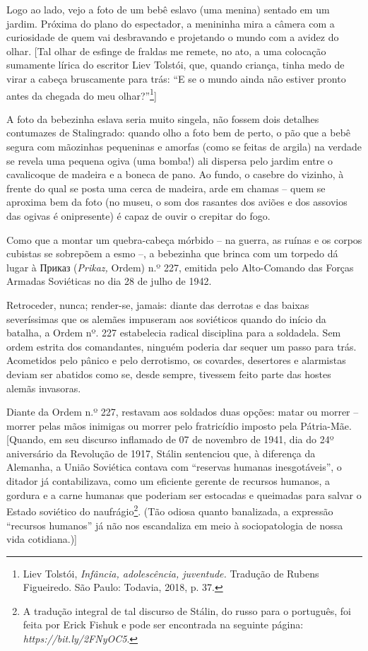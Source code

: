Logo ao lado, vejo a foto de um bebê eslavo (uma menina) sentado em um
jardim. Próxima do plano do espectador, a menininha mira a câmera com a
curiosidade de quem vai desbravando e projetando o mundo com a avidez do
olhar. {[}Tal olhar de esfinge de fraldas me remete, no ato, a uma
colocação sumamente lírica do escritor Liev Tolstói, que, quando
criança, tinha medo de virar a cabeça bruscamente para trás: ``E se o
mundo ainda não estiver pronto antes da chegada do meu
olhar?''\footnote{Liev Tolstói, \emph{Infância, adolescência,
  juventude.} Tradução de Rubens Figueiredo. São Paulo: Todavia, 2018,
  p. 37.}{]}

A foto da bebezinha eslava seria muito singela, não fossem dois detalhes
contumazes de Stalingrado: quando olho a foto bem de perto, o pão que a
bebê segura com mãozinhas pequeninas e amorfas (como se feitas de
argila) na verdade se revela uma pequena ogiva (uma bomba!) ali dispersa
pelo jardim entre o cavalicoque de madeira e a boneca de pano. Ao fundo,
o casebre do vizinho, à frente do qual se posta uma cerca de madeira,
arde em chamas -- quem se aproxima bem da foto (no museu, o som dos
rasantes dos aviões e dos assovios das ogivas é onipresente) é capaz de
ouvir o crepitar do fogo.

Como que a montar um quebra-cabeça mórbido -- na guerra, as ruínas e os
corpos cubistas se sobrepõem a esmo --, a bebezinha que brinca com um
torpedo dá lugar à Приказ (\emph{Prikaz,} Ordem) n.º 227, emitida pelo Alto-Comando das Forças Armadas Soviéticas no dia 28 de julho de 1942.

Retroceder, nunca; render-se, jamais: diante das derrotas e das baixas
severíssimas que os alemães impuseram aos soviéticos quando do início da
batalha, a Ordem nº. 227 estabelecia radical disciplina para a
soldadela. Sem ordem estrita dos comandantes, ninguém poderia dar sequer
um passo para trás. Acometidos pelo pânico e pelo derrotismo, os
covardes, desertores e alarmistas deviam ser abatidos como se, desde
sempre, tivessem feito parte das hostes alemãs invasoras.

Diante da Ordem n.º 227, restavam aos soldados duas opções: matar ou
morrer -- morrer pelas mãos inimigas ou morrer pelo fratricídio imposto
pela Pátria-Mãe. {[}Quando, em seu discurso inflamado de 07 de novembro
de 1941, dia do 24º aniversário da Revolução de 1917, Stálin sentenciou
que, à diferença da Alemanha, a União Soviética contava com ``reservas
humanas inesgotáveis'', o ditador já contabilizava, como um eficiente
gerente de recursos humanos, a gordura e a carne humanas que poderiam
ser estocadas e queimadas para salvar o Estado soviético do
naufrágio\footnote{A tradução integral de tal discurso de Stálin, do
  russo para o português, foi feita por Erick Fishuk e pode ser
  encontrada na seguinte página: \emph{https://bit.ly/2FNyOC5}.}.
(Tão odiosa quanto banalizada, a expressão ``recursos humanos'' já não
nos escandaliza em meio à sociopatologia de nossa vida cotidiana.){]}

